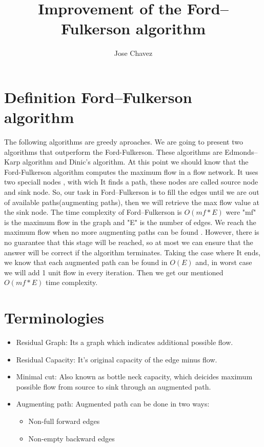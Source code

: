\documentclass{article}
\title{Improvement of the Ford–Fulkerson algorithm }
\author{Jose Chavez}
\begin{document}
    \maketitle
    \section{Definition Ford–Fulkerson algorithm}
    The following algorithms are greedy aproaches. We are going to present two algorithms that
    outperform the Ford-Fulkerson. These algorithms are Edmonds–Karp algorithm and Dinic's algorithm.
    At this point we should know that the Ford-Fulkerson algorithm computes the maximum flow in a flow network. It uses two speciall nodes , with wich It finds a path,
    these nodes are called source node and sink node. So, our task in Ford–Fulkerson is to fill the edges until we are out of available paths(augmenting paths), then we will retrieve the max flow value at the sink node.
    The time complexity of Ford–Fulkerson is $O(mf*E)$ were "mf" is the maximum flow in the graph and "E" is the number of edges. 
    We reach the maximum flow when no more augmenting paths can be found
    . However, there is no guarantee that this stage will be reached, so at most we can ensure that the answer will be correct
    if the algorithm terminates. Taking the case where It ends, we know that each augmented path
    can be found in $O(E)$ and, in worst case we will add 1 unit flow in every iteration. Then we get our mentioned $O(mf*E)$ time complexity.
    \section*{Terminologies}
    \begin{itemize}
        \item Residual Graph:
            Its a graph which indicates additional possible flow.
        \item Residual Capacity:
            It's original capacity of the edge minus flow. 
        \item Minimal cut:
            Also known as bottle neck capacity, which deicides maximum possible flow from source to sink through an augmented path.  
        \item Augmenting path:
            Augmented path can be done in two ways:
            \begin{itemize}
                \item Non-full forward edges
                \item Non-empty backward edges
            \end{itemize}
    \end{itemize}
\end{document}
